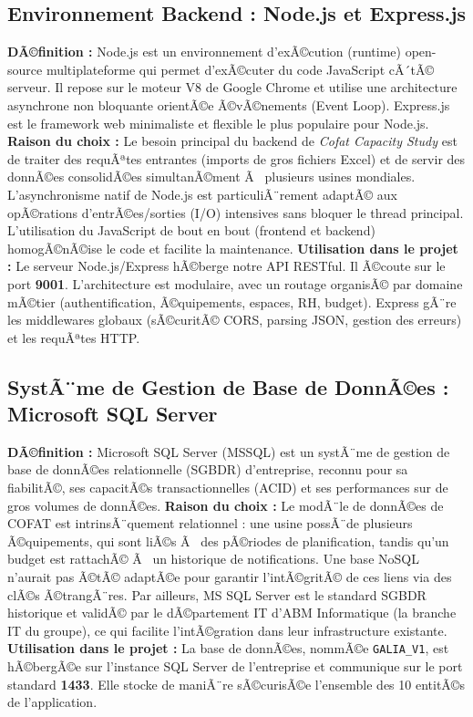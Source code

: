 \subsection{Environnement Backend : Node.js et Express.js}
\textbf{DÃ©finition :} Node.js est un environnement d'exÃ©cution (runtime) open-source multiplateforme qui permet d'exÃ©cuter du code JavaScript cÃ´tÃ© serveur. Il repose sur le moteur V8 de Google Chrome et utilise une architecture asynchrone non bloquante orientÃ©e Ã©vÃ©nements (Event Loop). Express.js est le framework web minimaliste et flexible le plus populaire pour Node.js.
\newline
\textbf{Raison du choix :} Le besoin principal du backend de \textit{Cofat Capacity Study} est de traiter des requÃªtes entrantes (imports de gros fichiers Excel) et de servir des donnÃ©es consolidÃ©es simultanÃ©ment Ã  plusieurs usines mondiales. L'asynchronisme natif de Node.js est particuliÃ¨rement adaptÃ© aux opÃ©rations d'entrÃ©es/sorties (I/O) intensives sans bloquer le thread principal. L'utilisation du JavaScript de bout en bout (frontend et backend) homogÃ©nÃ©ise le code et facilite la maintenance.
\newline
\textbf{Utilisation dans le projet :} Le serveur Node.js/Express hÃ©berge notre API RESTful. Il Ã©coute sur le port \textbf{9001}. L'architecture est modulaire, avec un routage organisÃ© par domaine mÃ©tier (authentification, Ã©quipements, espaces, RH, budget). Express gÃ¨re les middlewares globaux (sÃ©curitÃ© CORS, parsing JSON, gestion des erreurs) et les requÃªtes HTTP.

\subsection{SystÃ¨me de Gestion de Base de DonnÃ©es : Microsoft SQL Server}
\textbf{DÃ©finition :} Microsoft SQL Server (MSSQL) est un systÃ¨me de gestion de base de donnÃ©es relationnelle (SGBDR) d'entreprise, reconnu pour sa fiabilitÃ©, ses capacitÃ©s transactionnelles (ACID) et ses performances sur de gros volumes de donnÃ©es.
\newline
\textbf{Raison du choix :} Le modÃ¨le de donnÃ©es de COFAT est intrinsÃ¨quement relationnel : une usine possÃ¨de plusieurs Ã©quipements, qui sont liÃ©s Ã  des pÃ©riodes de planification, tandis qu'un budget est rattachÃ© Ã  un historique de notifications. Une base NoSQL n'aurait pas Ã©tÃ© adaptÃ©e pour garantir l'intÃ©gritÃ© de ces liens via des clÃ©s Ã©trangÃ¨res. Par ailleurs, MS SQL Server est le standard SGBDR historique et validÃ© par le dÃ©partement IT d'ABM Informatique (la branche IT du groupe), ce qui facilite l'intÃ©gration dans leur infrastructure existante.
\newline
\textbf{Utilisation dans le projet :} La base de donnÃ©es, nommÃ©e \texttt{GALIA\_V1}, est hÃ©bergÃ©e sur l'instance SQL Server de l'entreprise et communique sur le port standard \textbf{1433}. Elle stocke de maniÃ¨re sÃ©curisÃ©e l'ensemble des 10 entitÃ©s de l'application.


